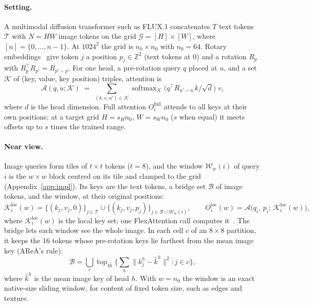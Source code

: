 \documentclass{article} %
\newcommand{\Oloc}{O^{\mathrm{loc}}}
\newcommand{\Ofull}{O^{\mathrm{full}}}
\newcommand{\Attn}{\mathcal{A}}
\newcommand{\Tset}{\mathcal{T}}
\newcommand{\Gset}{\mathcal{G}}
\newcommand{\Win}{\mathcal{W}}
\newcommand{\Kset}{\mathcal{K}}
\theoremstyle{remark}
\begin{document}
\paragraph{Setting.} A multimodal diffusion transformer such as FLUX.1 concatenates $T$ text tokens $\Tset$ with $N=HW$ image tokens on the grid $\Gset=[H]\times[W]$, where $[n]=\{0,\dots,n-1\}$. At $1024^2$ the grid is $n_0\times n_0$ with $n_0=64$. Rotary embeddings~\citep{su2021roformer} give token $j$ a position $p_j\in\mathbb{Z}^2$ (text tokens at $0$) and a rotation $R_p$ with $R_p^\top R_{p'}=R_{p'-p}$. For one head, a pre-rotation query $q$ placed at $u$, and a set $\Kset$ of (key, value, key position) triples, attention is
\begin{equation}
  \Attn(q,u;\Kset) \;=\; \textstyle\sum_{(k,v,u')\in\Kset} \operatorname{softmax}_{\Kset}\!\big(q^\top R_{u'-u}\,k/\sqrt d\big)\; v ,
  \label{eq:attn}
\end{equation}
where $d$ is the head dimension. Full attention $\Ofull_i$ attends to all keys at their own positions; at a target grid $H=s_Hn_0$, $W=s_Wn_0$ ($s$ when equal) it meets offsets up to $s$ times the trained range.

\paragraph{Near view.} Image queries form tiles of $t\times t$ tokens ($t=8$), and the window $\Win_w(i)$ of query $i$ is the $w\times w$ block centred on its tile and clamped to the grid (Appendix~\ref{app:impl}). Its keys are the text tokens, a bridge set $\mathcal{B}$ of image tokens, and the window, at their original positions:
\begin{equation}
  \Kset^{\mathrm{loc}}_i(w)=\{(k_j,v_j,0)\}_{j\in\Tset}\cup\{(k_j,v_j,p_j)\}_{j\in\mathcal{B}\cup\Win_w(i)},\qquad
  \Oloc_i(w)=\Attn\big(q_i,\,p_i;\,\Kset^{\mathrm{loc}}_i(w)\big),
  \label{eq:loc}
\end{equation}
where $\Kset^{\mathrm{loc}}_i(w)$ is the local key set; one FlexAttention call computes it~\citep{dong2024flex}. The bridge lets each window see the whole image. In each cell $c$ of an $8\times8$ partition, it keeps the 16 tokens whose pre-rotation keys lie farthest from the mean image key (AReA's rule):
\begin{equation}
  \mathcal{B}=\textstyle\bigcup_{c}\operatorname{top}_{16}\big\{\sum_{h}\|k^{h}_j-\bar k^{h}\|^2 : j\in c\big\},
  \label{eq:bridge}
\end{equation}
where $\bar k^{h}$ is the mean image key of head $h$. With $w=n_0$ the window is an exact native-size sliding window, for content of fixed token size, such as edges and texture.
\end{document}

